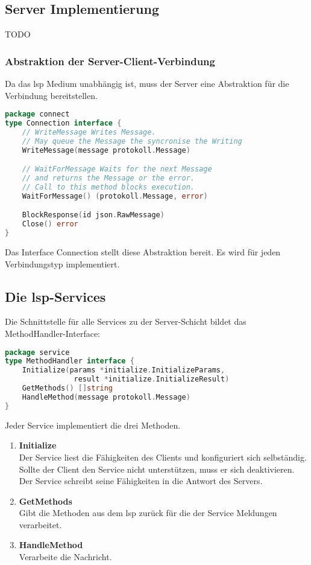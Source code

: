 \documentclass[./einleitung.tex]{subfiles}
\begin{document}
    \subsection{Server Implementierung}\label{subsec:server-implementierung}
       TODO
    \subsubsection{Abstraktion der Server-Client-Verbindung}
    Da das \acrshort{lsp} Medium unabhängig ist, muss der Server eine Abstraktion für die Verbindung bereitstellen.
    \begin{lstlisting}[language=Go]
package connect
type Connection interface {
	// WriteMessage Writes Message.
    // May queue the Message the syncronise the Writing
	WriteMessage(message protokoll.Message)

	// WaitForMessage Waits for the next Message
    // and returns the Message or the error.
	// Call to this method blocks execution.
	WaitForMessage() (protokoll.Message, error)

	BlockResponse(id json.RawMessage)
	Close() error
}
    \end{lstlisting}
    Das Interface Connection stellt diese Abstraktion bereit.
    Es wird für jeden Verbindungstyp implementiert.

    \subsection{Die \acrshort{lsp}-Services}
    Die Schnittstelle für alle Services zu der Server-Schicht bildet das MethodHandler-Interface:
    \begin{lstlisting}[language=Go]
package service
type MethodHandler interface {
	Initialize(params *initialize.InitializeParams,
                result *initialize.InitializeResult)
	GetMethods() []string
	HandleMethod(message protokoll.Message)
}
    \end{lstlisting}
    Jeder Service implementiert die drei Methoden.
    \begin{enumerate}
        \item \textbf{Initialize} \\
        Der Service liest die Fähigkeiten des Clients und konfiguriert sich selbständig.
        Sollte der Client den Service nicht unterstützen, muss er sich deaktivieren.
        Der Service schreibt seine Fähigkeiten in die Antwort des Servers.
        \item \textbf{GetMethods} \\
        Gibt die Methoden aus dem \acrshort{lsp} zurück für die der Service Meldungen verarbeitet.
        \item \textbf{HandleMethod} \\
        Verarbeite die Nachricht.
    \end{enumerate}
\end{document}
